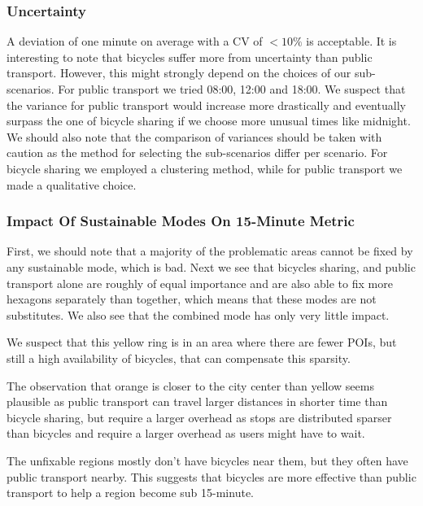 \subsubsection{Uncertainty}

A deviation of one minute on average with a CV of $<10\%$ is acceptable.
It is interesting to note that bicycles suffer more from uncertainty than public transport. 
However, this might strongly depend on the choices of our sub-scenarios. 
For public transport we tried 08:00, 12:00 and 18:00.
We suspect that the variance for public transport would increase more drastically and eventually surpass the one of bicycle sharing if we choose more unusual times like midnight.
We should also note that the comparison of variances should be taken with caution as the method for selecting the sub-scenarios differ per scenario.
For bicycle sharing we employed a clustering method, while for public transport we made a qualitative choice. 

\subsubsection{Impact Of Sustainable Modes On 15-Minute Metric}

First, we should note that a majority of the problematic areas cannot be fixed by any sustainable mode, which is bad.
Next we see that bicycles sharing, and public transport alone are roughly of equal importance and are also able to fix more hexagons separately than together, which means that these modes are not substitutes.
We also see that the combined mode has only very little impact.

We suspect that this yellow ring is in an area where there are fewer POIs, but still a high availability of bicycles, that can compensate this sparsity.

The observation that orange is closer to the city center than yellow seems plausible as public transport can travel larger distances in shorter time than bicycle sharing, but require a larger overhead as stops are distributed sparser than bicycles and require a larger overhead as users might have to wait.

The unfixable regions mostly don't have bicycles near them, but they often have public transport nearby.
This suggests that bicycles are more effective than public transport to help a region become sub 15-minute.
